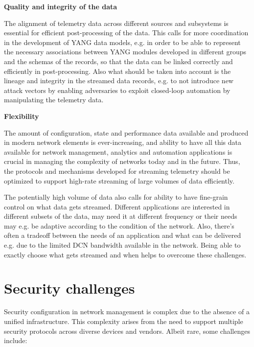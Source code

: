 \documentclass[10pt,sigconf]{iabart}
\begin{document}
\textbf{Quality and integrity of the data} 

The alignment of telemetry data across different sources and subsystems is essential for efficient post-processing of the data. This calls for more coordination in the development of YANG data models, e.g. in order to be able to represent the necessary associations between YANG modules developed in different groups and the schemas of the records, so that the data can be linked correctly and efficiently in post-processing. Also what should be taken into account is the lineage and integrity in the streamed data records, e.g. to not introduce new attack vectors by enabling adversaries to exploit closed-loop automation by manipulating the telemetry data.

\textbf{Flexibility}

The amount of configuration, state and performance data available and produced in modern network elements is ever-increasing, and ability to have all this data available for network management, analytics and automation applications is crucial in managing the complexity of networks today and in the future. Thus, the protocols and mechanisms developed for streaming telemetry should be optimized to support high-rate streaming of large volumes of data efficiently. 

The potentially high volume of data also calls for ability to have fine-grain control on what data gets streamed. Different applications are interested in different subsets of the data, may need it at different frequency or their needs may e.g. be adaptive according to the condition of the network. Also, there's often a tradeoff between the needs of an application and what can be delivered e.g. due to the limited DCN bandwidth available in the network. Being able to exactly
choose what gets streamed and when helps to overcome these challenges.


\section{Security challenges} \label{security}

Security configuration in network management is complex due to the absence of a unified infrastructure. This complexity arises from the need to support multiple security protocols across diverse devices and vendors. Albeit rare, some challenges include:
\end{document}
